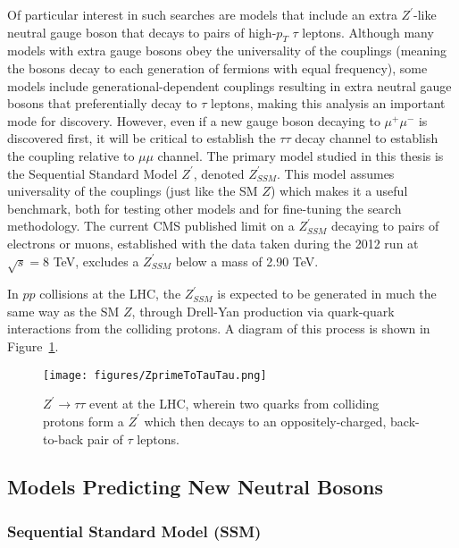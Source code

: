 Of particular interest in such searches are models that include an extra $Z^\prime$-like neutral gauge boson that decays to pairs of high-$p_{T}$ $\tau$ leptons. Although many models with extra gauge bosons obey the universality of the couplings (meaning the bosons decay to each generation of fermions with equal frequency), some models include generational-dependent couplings resulting in extra neutral gauge bosons that preferentially decay to $\tau$ leptons, making this analysis an important mode for discovery. However, even if a new gauge boson decaying to $\mu^+\mu^-$ is discovered first, it will be critical to establish the $\tau\tau$ decay channel to establish the coupling relative to $\mu\mu$ channel. The primary model studied in this thesis is the Sequential Standard Model $Z^\prime$, denoted $Z^{\prime}_{SSM}$. This model assumes universality of the couplings (just like the SM $Z$) which makes it a useful benchmark, both for testing other models and for fine-tuning the search methodology. The current CMS published limit on a $Z^{\prime}_{SSM}$ decaying to pairs of electrons or muons, established with the data taken during the 2012 run at $\sqrt{s} = 8$ TeV, excludes a $Z^{\prime}_{SSM}$ below a mass of 2.90 TeV\cite{ZprimeToEE}.

In $pp$ collisions at the LHC, the $Z^\prime_{SSM}$ is expected to be generated in much the same way as the SM $Z$, through Drell-Yan production via quark-quark interactions from the colliding protons. A diagram of this process is shown in Figure~\ref{fig:ZprimeToTauTau}.

\begin{figure}
\centering
  \texttt{[image: figures/ZprimeToTauTau.png]}
  \caption{\label{fig:ZprimeToTauTau} $Z^\prime \to \tau\tau$ event at the LHC, wherein two quarks from colliding protons form a $Z^\prime$ which then decays to an oppositely-charged, back-to-back pair of $\tau$ leptons.}
\end{figure}

\subsection{Models Predicting New Neutral Bosons}

\subsubsection{Sequential Standard Model (SSM)}

